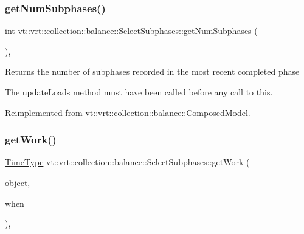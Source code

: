 \subsubsection{\texorpdfstring{get\+Num\+Subphases()}{getNumSubphases()}}
{\footnotesize\ttfamily int vt\+::vrt\+::collection\+::balance\+::\+Select\+Subphases\+::get\+Num\+Subphases (\begin{DoxyParamCaption}{ }\end{DoxyParamCaption})\hspace{0.3cm}{\ttfamily [override]}, {\ttfamily [virtual]}}

Returns the number of subphases recorded in the most recent completed phase

The {\ttfamily update\+Loads} method must have been called before any call to this. 

Reimplemented from \hyperlink{classvt_1_1vrt_1_1collection_1_1balance_1_1_composed_model_af3ea09828c281d9c278198a19fe4e533}{vt\+::vrt\+::collection\+::balance\+::\+Composed\+Model}.

\mbox{\label{classvt_1_1vrt_1_1collection_1_1balance_1_1_select_subphases_abca8bb1ca9edf950931d1bfd026c0474}} 
\subsubsection{\texorpdfstring{get\+Work()}{getWork()}}
{\footnotesize\ttfamily \hyperlink{namespacevt_a876a9d0cd5a952859c72de8a46881442}{Time\+Type} vt\+::vrt\+::collection\+::balance\+::\+Select\+Subphases\+::get\+Work (\begin{DoxyParamCaption}\item[{\hyperlink{namespacevt_1_1vrt_1_1collection_1_1balance_a14c8d2c972f2913aa3f1636e5be0a120}{Element\+I\+D\+Type}}]{object,  }\item[{\hyperlink{structvt_1_1vrt_1_1collection_1_1balance_1_1_phase_offset}{Phase\+Offset}}]{when }\end{DoxyParamCaption})\hspace{0.3cm}{\ttfamily [override]}, {\ttfamily [virtual]}}



